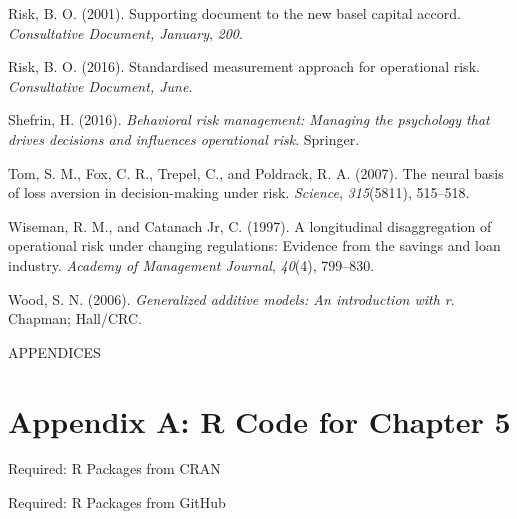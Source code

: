 \documentclass[]{DissertateUSU}
\begin{document}
\hypertarget{ref-risk2001supporting}{}
Risk, B. O. (2001). Supporting document to the new basel capital accord.
\emph{Consultative Document, January}, \emph{200}.

\hypertarget{ref-risk2016supporting}{}
Risk, B. O. (2016). Standardised measurement approach for operational
risk. \emph{Consultative Document, June}.

\hypertarget{ref-shefrin2016behavioral}{}
Shefrin, H. (2016). \emph{Behavioral risk management: Managing the
psychology that drives decisions and influences operational risk}.
Springer.

\hypertarget{ref-tom2007neural}{}
Tom, S. M., Fox, C. R., Trepel, C., and Poldrack, R. A. (2007). The
neural basis of loss aversion in decision-making under risk.
\emph{Science}, \emph{315}(5811), 515--518.

\hypertarget{ref-wiseman1997longitudinal}{}
Wiseman, R. M., and Catanach Jr, C. (1997). A longitudinal
disaggregation of operational risk under changing regulations: Evidence
from the savings and loan industry. \emph{Academy of Management
Journal}, \emph{40}(4), 799--830.

\hypertarget{ref-wood2006generalized}{}
Wood, S. N. (2006). \emph{Generalized additive models: An introduction
with r}. Chapman; Hall/CRC.

\clearpage
{} 
\fancyhead[R]{\thepage} \fancyfoot[C]{}

\vspace*{\fill}

\begin{center}
    APPENDICES 
  \end{center}

\vspace*{\fill}

\clearpage

\doublespacing

\section*{Appendix A: R Code for Chapter
5}\label{appendix-a-r-code-for-chapter-5}

\singlespace

Required: R Packages from CRAN

\small

\normalsize

Required: R Packages from GitHub
\end{document}
